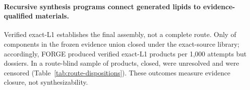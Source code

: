 \documentclass{article}
\begin{document}
\begin{table}[t]
\caption{\textbf{Common Ugi benchmark.}
Yields per 1,000 attempts under a common component-disjoint three-seed protocol and verifier
(mean $\pm$ sample standard deviation). Component-novel denotes one returned decomposition containing
a precursor absent from method-visible training, not strong catalogue escape. Whole-molecule
baselines are assessed post hoc. $\dagger$, structural zero; N/E, not estimable. Details:
Appendix~\ref{app:results}.}
\label{tab:ugi-common-benchmark}
\centering
\scriptsize
\setlength{\tabcolsep}{2.2pt}
\end{table}

\paragraph{Recursive synthesis programs connect generated lipids to evidence-qualified materials.}
Verified exact-L1 establishes the final assembly, not a complete route. Only
\ForgeCommonRouteEvidenceCompleteComponents{} of \ForgeCommonRouteUnionComponents{} components in
the frozen evidence union closed under the exact-source library; accordingly, FORGE produced
\ForgeCommonRouteForgeExactPerThousand{} verified exact-L1 products per 1,000 attempts but
\ForgeCommonRouteForgeCompletePerThousand{} dossiers. In a route-blind sample of
\ForgeRouteCandidates{} products, \ForgeRouteCompleteProducts{} closed,
\ForgeRouteUnresolvedProducts{} were unresolved and \ForgeRouteCensoredProducts{} were censored
(Table~\ref{tab:route-dispositions}). These outcomes measure evidence closure, not synthesizability.
\end{document}
